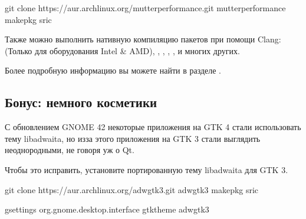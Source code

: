 \documentclass[letterpaper,10pt,russian,openany]{sphinxmanual}
\begin{document}
\sphinxAtStartPar
{}

\begin{sphinxVerbatim}[commandchars=\\\{\}]
git clone https://aur.archlinux.org/mutter\PYGZhy{}performance.git 
 mutter\PYGZhy{}performance                                      
makepkg \PYGZhy{}sric                                              
\end{sphinxVerbatim}

\sphinxAtStartPar
Также можно выполнить нативную компиляцию пакетов при помощи Clang:  (Только для оборудования Intel \& AMD),
, ,
, ,
 и многих других.

\sphinxAtStartPar
Более подробную информацию вы можете найти в разделе .

\ignorespaces 

\subsection{Бонус: немного косметики}
\label{\detokenize{source/de-optimizations:gnome-cosmetics}}\label{\detokenize{source/de-optimizations:index-6}}\label{\detokenize{source/de-optimizations:id2}}
\sphinxAtStartPar
С обновлением GNOME 42 некоторые приложения на GTK 4 стали использовать тему libadwaita, но из\sphinxhyphen{}за этого
приложения на GTK 3 стали выглядить неоднородными, не говоря уж о Qt.

\sphinxAtStartPar
Чтобы это исправить, установите портированную тему libadwaita для GTK 3.

\sphinxAtStartPar
{}

\begin{sphinxVerbatim}[commandchars=\\\{\}]
git clone https://aur.archlinux.org/adw\PYGZhy{}gtk3.git 
 adw\PYGZhy{}gtk3                                      
makepkg \PYGZhy{}sric                                    

gsettings  org.gnome.desktop.interface gtk\PYGZhy{}theme adw\PYGZhy{}gtk3
\end{sphinxVerbatim}
\end{document}
